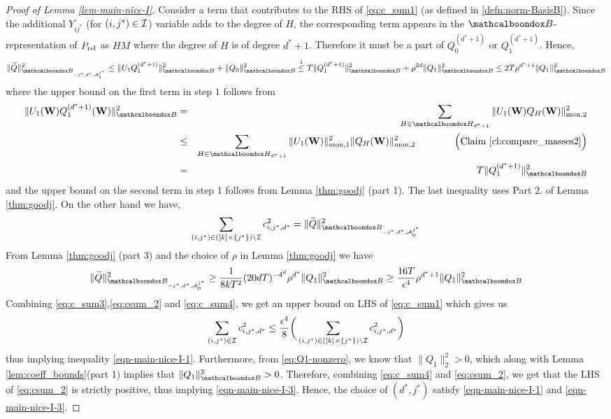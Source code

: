 \begin{proof}[Proof of Lemma \ref{lem-main-nice-I}]
	
	Consider a term that contributes to the RHS of \eqref{eq:c_sum1} (as defined in \ref{defn:norm-BasisB}). Since the additional $Y_{ij^*}$ (for $(i,j^*) \in \mathcal{I}$) variable adds to the degree of $H$, the corresponding term appears in the $\basisA$-representation of $P_{\rm rel}$ as $HM$ where the degree of $H$ is of degree $d^*+1$. Therefore it must be a part of $Q^{(d^*+1)}_0$ or $Q^{(d^* + 1)}_1$. Hence,
	 \begin{equation}
	 	\| \Wq\|^2_{\mcb{B}_{-j^*,d^*,\mc{A}^{j^*}_1}}   
	 	\le \|U_1{Q}^{(d^* + 1)}_1\|^2_\basisA + \|{Q}_0\|^2_\basisA  
	 	\overset{1}{\le}     T\|{Q}^{(d^* + 1)}_1\|^2_\basisA + \rho^{2d}\|Q_1\|^2_\basisA 
	 	\le 2T\rho^{d^* + 1}\|Q_1\|^2_\basisA			\label{eq:c_sum3} 		
	 \end{equation}
    \noindent where the upper bound on the first term in step $1$ follows from  
	\begin{eqnarray*}
	\|U_1({\bf W}){Q}^{(d^* + 1)}_1({\bf W})\|^2_\basisA 
	&=&\sum_{H \in \mcb{H}_{d^* + 1}} \|U_1({\bf W}) Q_H({\bf W})\|^2_{\rm mon,2} \\
	&\le& \sum_{H \in \mcb{H}_{d^* + 1}} \|U_1({\bf W})\|^2_{\rm mon,1} \|Q_H({\bf W})\|^2_{\rm mon,2}  \qquad\qquad \Big(\mbox{Claim } \ref{cl:compare_masses2}\Big)\\
	&=&T\|Q^{(d^* + 1)}_1\|^2_\basisA
	\end{eqnarray*}
	\noindent and the upper bound on the second term in step $1$ follows from Lemma \ref{thm:goodj} (part 1). The last inequality uses Part 2. of Lemma \ref{thm:goodj}. On the other hand we have,
	\begin{equation}				\label{eq:csum_2}					
		\sum_{(i,j^*) \in ([k]\times\{j^*\})\setminus\mc{I}} c_{i,j^*,d^*}^2 = \|\Wq\|^2_{\mcb{B}_{-j^*,d^*,\mc{A}^{j^*}_0}} 
	\end{equation}
	From Lemma \ref{thm:goodj} (part 3) and the choice of $\rho$ in Lemma \ref{thm:goodj} we have
	\begin{equation}			\label{eq:c_sum4}
	\|\Wq\|^2_{\mcb{B}_{-j^*,d^*,\mc{A}^{j^*}_0}}  \ge \frac{1}{8kT^2}(20dT)^{-4^d}\rho^{d^*}\|Q_1\|^2_\basisA \ge \frac{16T}{\epsilon^4}\rho^{d^* + 1}\|Q_1\|^2_\basisA	
	\end{equation}
	Combining   \eqref{eq:c_sum3},\eqref{eq:csum_2} and \eqref{eq:c_sum4}, we get an upper bound on LHS of \eqref{eq:c_sum1} which gives us
	\begin{equation}
		\sum_{(i,j^*) \in \mathcal{I}} c_{i,j^*,d^*}^2  \le \frac{\epsilon^4}{8} \bigg(\sum_{(i,j^*) \in ([k]\times\{j^*\})\setminus\mathcal{I}} c_{i,j^*,d^*}^2\bigg)
	\end{equation}
	thus implying inequality \eqref{eqn-main-nice-I-1}. Furthermore, from \eqref{eq:Q1-nonzero}, we know that $\|Q_1\|^2_2 > 0$, which along with Lemma \ref{lem:coeff_bounds}(part 1) implies that $\|Q_1\|^2_\basisA > 0$. Therefore, combining \eqref{eq:c_sum4} and \eqref{eq:csum_2}, we get that the LHS of \eqref{eq:csum_2} is strictly positive, thus implying \eqref{eqn-main-nice-I-3}. Hence, the choice of $(d^*,j^*)$ satisfy \eqref{eqn-main-nice-I-1} and \eqref{eqn-main-nice-I-3}.
\end{proof}


